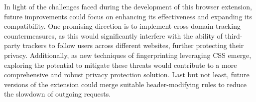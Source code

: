 In light of the challenges faced during the development of this browser extension, future improvements could focus on enhancing its effectiveness and expanding its compatibility. One promising direction is to implement cross-domain tracking countermeasures, as this would significantly interfere with the ability of third-party trackers to follow users across different websites, further protecting their privacy. Additionally, as new techniques of fingerprinting leveraging CSS emerge, exploring the potential to mitigate these threats would contribute to a more comprehensive and robust privacy protection solution. Last but not least, future versions of the extension could merge suitable header-modifying rules to reduce the slowdown of outgoing requests.

% 